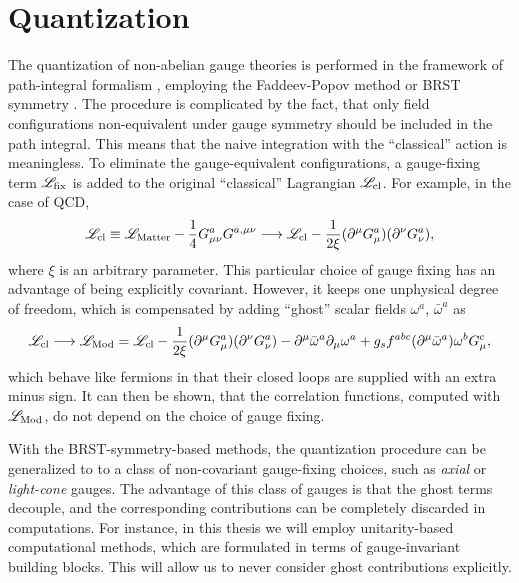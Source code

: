 \section{Quantization}
\label{sec:quant-gauge-fixing}

The quantization of non-abelian gauge theories is performed in
the framework of path-integral formalism \cite{Feynman:1950ir},
employing the Faddeev-Popov method \cite{Faddeev:1967fc} or 
BRST symmetry \cite{Becchi:1975nq,Tyutin:1975qk}.
The procedure is complicated by the fact, that only 
field configurations non-equivalent under gauge symmetry should be included in the path integral.
This means that the naive integration with the ``classical'' action is meaningless.
To eliminate the gauge-equivalent configurations, a gauge-fixing term ${\mathscr{L}}_\text{fix} $ is added to the original
``classical'' Lagrangian ${\mathscr{L}}_\text{cl} $.
For example, in the case of QCD,
\begin{equation}
    {\mathscr{L}}_\text{cl} \equiv {\mathscr{L}}_{\text{Matter}}  -  \frac{1}{4}G^a_{\mu\nu}G^{a,\mu\nu}   \longrightarrow {\mathscr{L}}_\text{cl}  - \frac{1}{2\xi}(\partial^\mu G_\mu^a)(\partial^\nu G_\nu^a),
\end{equation}
where $\xi$ is an arbitrary parameter. This particular choice of gauge fixing has an advantage of being explicitly covariant.
However, it keeps one unphysical degree of freedom, which is compensated by adding ``ghost'' scalar fields $\omega^a$, $\bar\omega^a$ as
\begin{equation}
    {\mathscr{L}}_\text{cl} \longrightarrow {\mathscr{L}}_\text{Mod}  = {\mathscr{L}}_\text{cl}  - \frac{1}{2\xi}(\partial^\mu G_\mu^a)(\partial^\nu G_\nu^a) - \partial^\mu \bar{\omega}^a \partial_\mu \omega^a + g_s f^{abc}\qty(\partial^\mu \bar{\omega}^a) \omega^b G_\mu^c, 
\end{equation}
which behave like fermions in that their closed loops are supplied with an extra minus sign.
It can then be shown, that the correlation functions, computed with ${\mathscr{L}}_\text{Mod} $, do not depend on the choice of gauge fixing.

With the BRST-symmetry-based methods, the quantization procedure can be generalized to 
to a class of non-covariant gauge-fixing choices, such as \emph{axial} or \emph{light-cone} gauges.
The advantage of this class of  gauges is that the ghost terms decouple, and the corresponding contributions can be completely discarded in computations.
For instance, in this thesis we will employ unitarity-based computational methods, which are  formulated in terms of gauge-invariant building blocks.
This will allow us to never consider ghost contributions explicitly.

